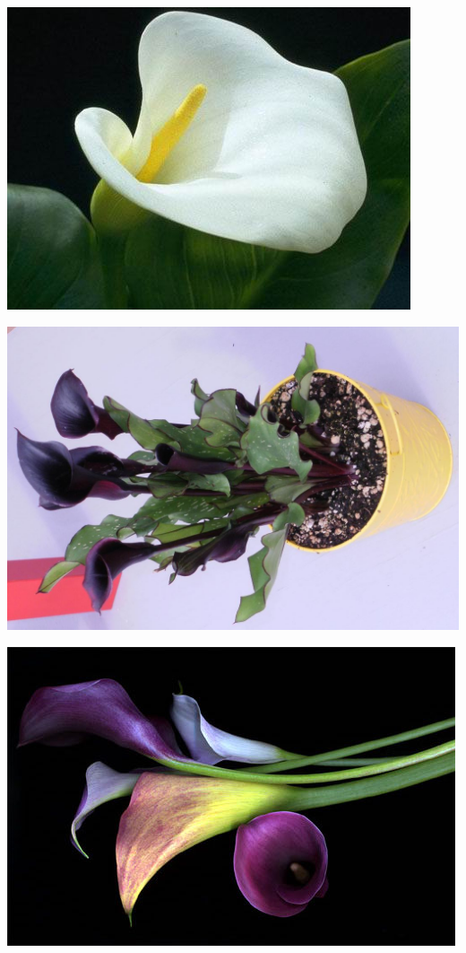\documentclass{article}
\begin{document}
\begin{center}
\includegraphics[height=0.925\paperheight]{../CallaLily.jpg}
\end{center}
\newpage

\begin{center}
\includegraphics[height=0.925\paperheight]{../CallaLily_black.jpg}
\end{center}
\newpage

\begin{center}
\includegraphics[height=0.925\paperheight]{../CallaLily_color.jpg}
\end{center}
\newpage
\end{document}
